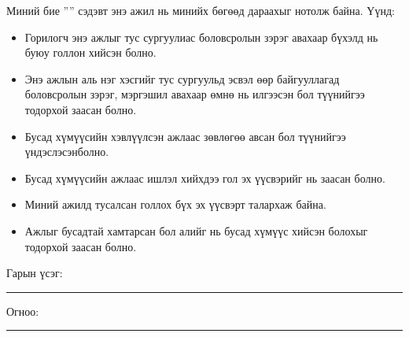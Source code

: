 \begin{declaration}
\addchaptertocentry{\authorshipname}

\noindent Миний бие \shortname  ''{\ttitle}'' сэдэвт энэ ажил нь минийх бөгөөд дараахыг нотолж байна. Үүнд:

\begin{itemize} 
\item Горилогч энэ ажлыг тус сургуулиас боловсролын зэрэг авахаар бүхэлд нь буюу голлон хийсэн болно.
\item Энэ ажлын аль нэг хэсгийг тус сургуульд эсвэл өөр байгууллагад боловсролын зэрэг, мэргэшил авахаар өмнө нь илгээсэн бол түүнийгээ тодорхой заасан болно.
\item Бусад хүмүүсийн хэвлүүлсэн ажлаас зөвлөгөө авсан бол түүнийгээ үндэслэсэн\break болно.
\item Бусад хүмүүсийн ажлаас ишлэл хийхдээ гол эх үүсвэрийг нь заасан болно.
\item Миний ажилд тусалсан голлох бүх эх үүсвэрт талархаж байна.
\item Ажлыг бусадтай хамтарсан бол алийг нь бусад хүмүүс хийсэн болохыг тодорхой заасан болно.
\end{itemize}
\bigskip
 
\noindent Гарын үсэг: \rule[-0.5em]{12.7em}{0.5pt}
\bigskip

\noindent Огноо: \rule[-0.5em]{15em}{0.5pt}

\end{declaration}

\clearpage

